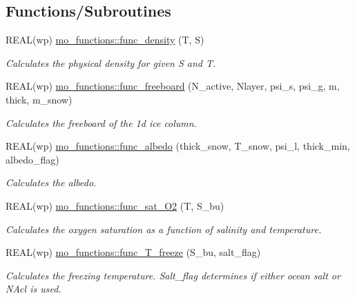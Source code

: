 \subsection*{Functions/Subroutines}
\begin{DoxyCompactItemize}
\item 
REAL(wp) \hyperlink{namespacemo__functions_a1799a36a0ad153bc87957b7e87ad9b3c}{mo\_\-functions::func\_\-density} (T, S)
\begin{DoxyCompactList}\small\item\em Calculates the physical density for given S and T. \item\end{DoxyCompactList}\item 
REAL(wp) \hyperlink{namespacemo__functions_a3f4e5c13d71b23efaa040a3d14e55f64}{mo\_\-functions::func\_\-freeboard} (N\_\-active, Nlayer, psi\_\-s, psi\_\-g, m, thick, m\_\-snow)
\begin{DoxyCompactList}\small\item\em Calculates the freeboard of the 1d ice column. \item\end{DoxyCompactList}\item 
REAL(wp) \hyperlink{namespacemo__functions_ac51bdce087ab161f25d6ad11a28e655c}{mo\_\-functions::func\_\-albedo} (thick\_\-snow, T\_\-snow, psi\_\-l, thick\_\-min, albedo\_\-flag)
\begin{DoxyCompactList}\small\item\em Calculates the albedo. \item\end{DoxyCompactList}\item 
REAL(wp) \hyperlink{namespacemo__functions_a2983289475e56c950511d8b6e37b1064}{mo\_\-functions::func\_\-sat\_\-O2} (T, S\_\-bu)
\begin{DoxyCompactList}\small\item\em Calculates the oxygen saturation as a function of salinity and temperature. \item\end{DoxyCompactList}\item 
REAL(wp) \hyperlink{namespacemo__functions_a9413c611dfaf39e6cf8441a766b5df8b}{mo\_\-functions::func\_\-T\_\-freeze} (S\_\-bu, salt\_\-flag)
\begin{DoxyCompactList}\small\item\em Calculates the freezing temperature. Salt\_\-flag determines if either ocean salt or NAcl is used. \item\end{DoxyCompactList}\item 

\end{DoxyCompactItemize}
